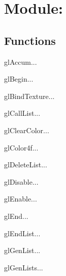 \section{Module: }
\subsection{Functions}
\begin{funcdesc}{glAccum}{...}
\end{funcdesc}

\begin{funcdesc}{glBegin}{...}
\end{funcdesc}

\begin{funcdesc}{glBindTexture}{...}
\end{funcdesc}

\begin{funcdesc}{glCallList}{...}
\end{funcdesc}

\begin{funcdesc}{glClearColor}{...}
\end{funcdesc}

\begin{funcdesc}{glColor4f}{...}
\end{funcdesc}

\begin{funcdesc}{glDeleteList}{...}
\end{funcdesc}

\begin{funcdesc}{glDisable}{...}
\end{funcdesc}

\begin{funcdesc}{glEnable}{...}
\end{funcdesc}

\begin{funcdesc}{glEnd}{...}
\end{funcdesc}

\begin{funcdesc}{glEndList}{...}
\end{funcdesc}

\begin{funcdesc}{glGenList}{...}
\end{funcdesc}

\begin{funcdesc}{glGenLists}{...}
\end{funcdesc}

